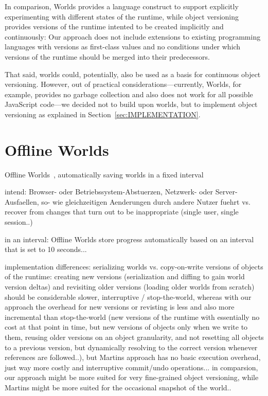 In comparison, Worlds provides a language construct to support explicitly experimenting with different states of the runtime, while object versioning provides versions of the runtime intented to be created implicitly and continuously: Our approach does not include extensions to existing programming languages with versions as first-class values and no conditions under which versions of the runtime should be merged into their predecessors.

That said, worlds could, potentially, also be used as a basis for continuous object versioning.
However, out of practical considerations---currently, Worlds, for example, provides no garbage collection and also does not work for all possible JavaScript code---we decided not to build upon worlds, but to implement object versioning as explained in Section~\ref{sec:IMPLEMENTATION}.


\section{Offline Worlds}
Offline Worlds~\cite{Czuchra2012OfW}, automatically saving worlds in a fixed interval

intend: Browser- oder Betriebssystem-Abstuerzen, Netzwerk- oder Server-Ausfaellen, so- wie gleichzeitigen Aenderungen durch andere Nutzer fuehrt
vs. recover from changes that turn out to be inappropriate (single user, single session..)

in an interval: Offline Worlds store progress automatically based on an interval that is set to 10 seconds...

implementation differences: serializing worlds vs. copy-on-write versions of objects of the runtime: creating new versions (serialization and diffing to gain world version deltas) and revisiting older versions (loading older worlds from scratch) should be considerable slower, interruptive / stop-the-world, whereas with our approach the overhead for new versions or revisting is less and also more incremental than stop-the-world (new versions of the runtime with essentially no cost at that point in time, but new versions of objects only when we write to them, reusing older versions on an object granularity, and not resetting all objects to a previous version, but dynamically resolving to the correct version whenever references are followed..), but Martins approach has no basic execution overhead, just way more costly and interruptive commit/undo operations... in comparsion, our approach might be more suited for very fine-grained object versioning, while Martins might be more suited for the occasional snapshot of the world..



